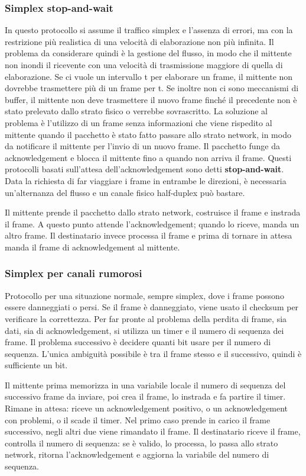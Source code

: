 \subsubsection{Simplex stop-and-wait}
In questo protocollo si assume il traffico simplex e l'assenza di errori, ma con la restrizione più realistica di una velocità di elaborazione non più infinita.
Il problema da considerare quindi è la gestione del flusso, in modo che il mittente non inondi il ricevente con una velocità di trasmissione maggiore di quella di elaborazione.
Se ci vuole un intervallo t per elaborare un frame, il mittente non dovrebbe trasmettere più di un frame per t.
Se inoltre non ci sono meccanismi di buffer, il mittente non deve trasmettere il nuovo frame finché il precedente non è stato prelevato dallo strato fisico o verrebbe sovrascritto.
La soluzione al problema è l'utilizzo di un frame senza informazioni che viene rispedito al mittente quando il pacchetto è stato fatto passare allo strato network,
in modo da notificare il mittente per l'invio di un nuovo frame.
Il pacchetto funge da acknowledgement e blocca il mittente fino a quando non arriva il frame.
Questi protocolli basati sull'attesa dell'acknowledgement sono detti \textbf{stop-and-wait}.
Data la richiesta di far viaggiare i frame in entrambe le direzioni, è necessaria un'alternanza del flusso e un canale fisico half-duplex può bastare.

Il mittente prende il pacchetto dallo strato network, costruisce il frame e instrada il frame. 
A questo punto attende l'acknowledgement; quando lo riceve, manda un altro frame.
Il destinatario invece processa il frame e prima di tornare in attesa manda il frame di acknowledgement al mittente.

\subsubsection{Simplex per canali rumorosi}
Protocollo per una situazione normale, sempre simplex, dove i frame possono essere danneggiati o persi.
Se il frame è danneggiato, viene usato il checksum per verificare la correttezza.
Per far pronte al problema della perdita di frame, sia dati, sia di acknowledgement, si utilizza un timer e il numero di sequenza dei frame.
Il problema successivo è decidere quanti bit usare per il numero di sequenza.
L'unica ambiguità possibile è tra il frame stesso e il successivo, quindi è sufficiente un bit.

Il mittente prima memorizza in una variabile locale il numero di sequenza del successivo frame da inviare, poi crea il frame, lo instrada e fa partire il timer.
Rimane in attesa: riceve un acknowledgement positivo, o un acknowledgement con problemi, o il scade il timer.
Nel primo caso prende in carico il frame successivo, negli altri due viene rimandato il frame.
Il destinatario riceve il frame, controlla il numero di sequenza: 
se è valido, lo processa, lo passa allo strato network, ritorna l'acknowledgement e aggiorna la variabile del numero di sequenza.

